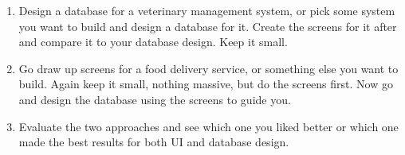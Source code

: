 \begin{enumerate}
\item Design a database for a veterinary management system, or pick some system you want to build and
    design a database for it.  Create the screens for it after and compare it to your database design.
    Keep it small.
\item Go draw up screens for a food delivery service, or something else you want to build.  Again keep
    it small, nothing massive, but do the screens first.  Now go and design the database using the
    screens to guide you.
\item Evaluate the two approaches and see which one you liked better or which one made the best results
    for both UI and database design.
\end{enumerate}

